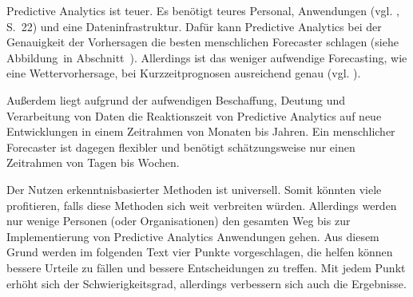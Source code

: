 Predictive Analytics ist teuer. Es benötigt teures Personal, Anwendungen (vgl. \cite{Iffert}, S.~22) und eine
Dateninfrastruktur. Dafür kann Predictive Analytics bei der
Genauigkeit der Vorhersagen die besten menschlichen Forecaster schlagen (siehe Abbildung~\xcom in Abschnitt~\xcom).
Allerdings ist das weniger aufwendige Forecasting, wie eine Wettervorhersage, bei Kurzzeitprognosen ausreichend genau
(vgl. \cite{Economist}).

Außerdem liegt aufgrund der aufwendigen Beschaffung, Deutung und Verarbeitung von Daten die Reaktionszeit von
Predictive Analytics auf neue Entwicklungen in einem Zeitrahmen von Monaten bis Jahren. Ein menschlicher Forecaster
ist dagegen flexibler und benötigt schätzungsweise nur einen Zeitrahmen von Tagen bis Wochen.

Der Nutzen erkenntnisbasierter Methoden ist universell. Somit könnten viele profitieren,
falls diese Methoden sich weit verbreiten würden. Allerdings werden nur wenige Personen
(oder Organisationen) den gesamten Weg bis zur Implementierung von Predictive Analytics
Anwendungen gehen. Aus diesem Grund werden im folgenden Text vier Punkte vorgeschlagen,
die helfen können bessere Urteile zu fällen und bessere Entscheidungen zu treffen. Mit jedem
Punkt erhöht sich der Schwierigkeitsgrad, allerdings verbessern sich auch die Ergebnisse.

